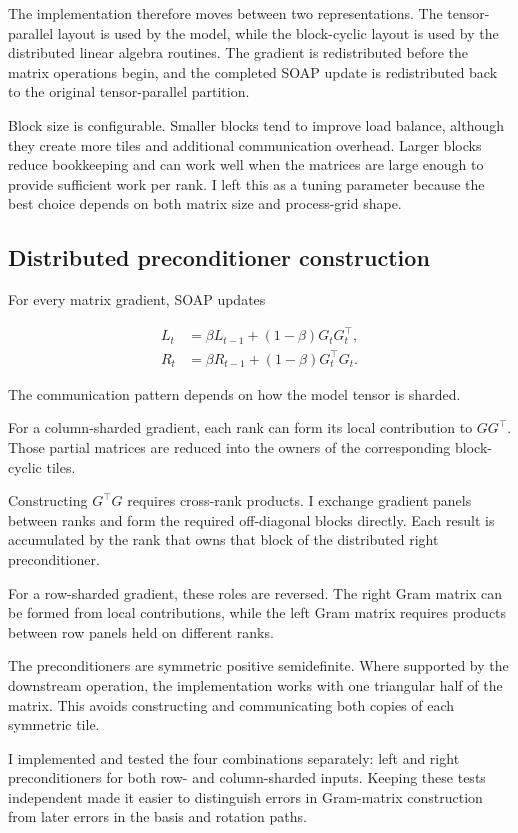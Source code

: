 \documentclass[11pt]{article}
\begin{document}
The implementation therefore moves between two representations. The tensor-parallel layout is used by the model, while the block-cyclic layout is used by the distributed linear algebra routines. The gradient is redistributed before the matrix operations begin, and the completed SOAP update is redistributed back to the original tensor-parallel partition.

Block size is configurable. Smaller blocks tend to improve load balance, although they create more tiles and additional communication overhead. Larger blocks reduce bookkeeping and can work well when the matrices are large enough to provide sufficient work per rank. I left this as a tuning parameter because the best choice depends on both matrix size and process-grid shape.

\subsection{Distributed preconditioner construction}

For every matrix gradient, SOAP updates

\begin{align}
L_t &= \beta L_{t-1} + (1-\beta)G_tG_t^\top, \\
R_t &= \beta R_{t-1} + (1-\beta)G_t^\top G_t.
\end{align}

The communication pattern depends on how the model tensor is sharded.

For a column-sharded gradient, each rank can form its local contribution to
$GG^\top$. Those partial matrices are reduced into the owners of the corresponding block-cyclic tiles.

Constructing $G^\top G$ requires cross-rank products. I exchange gradient panels between ranks and form the required off-diagonal blocks directly. Each result is accumulated by the rank that owns that block of the distributed right preconditioner.

For a row-sharded gradient, these roles are reversed. The right Gram matrix can be formed from local contributions, while the left Gram matrix requires products between row panels held on different ranks.

The preconditioners are symmetric positive semidefinite. Where supported by the downstream operation, the implementation works with one triangular half of the matrix. This avoids constructing and communicating both copies of each symmetric tile.

I implemented and tested the four combinations separately: left and right preconditioners for both row- and column-sharded inputs. Keeping these tests independent made it easier to distinguish errors in Gram-matrix construction from later errors in the basis and rotation paths.
\end{document}
